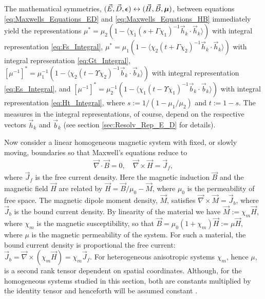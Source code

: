 \documentclass[english,12pt]{ttuthes}
\newcommand\beps{\mbox{\boldmath${\epsilon}$}}
\newcommand\bmu{\mbox{\boldmath${\mu}$}}
\begin{document}
The mathematical symmetries,
$(\vec{E},\vec{D},\beps)\leftrightarrow(\vec{H},\vec{B},\bmu)$, 
between equations \eqref{eq:Maxwells_Equations_ED} and
\eqref{eq:Maxwells_Equations_HB} immediately yield the representations
$\mu^*=\mu_2(1-\langle\chi_1(s+\Gamma\chi_1)^{-1}\vec{h}_k\cdot\vec{h}_k\rangle)$ with integral
representation \eqref{eq:Fs_Integral},
$\mu^*=\mu_1(1-\langle\chi_2(t+\Gamma\chi_2)^{-1}\vec{h}_k\cdot\vec{h}_k\rangle)$ with integral 
representation \eqref{eq:Gt_Integral},
$[\mu^{-1}]^*=\mu_1^{-1}(1-\langle\chi_2(t-\Upsilon\chi_2)^{-1}\vec{b}_k\cdot\vec{b}_k\rangle)$ with integral  
representation \eqref{eq:Es_Integral}, and
$[\mu^{-1}]^*=\mu_2^{-1}(1-\langle\chi_1(t-\Upsilon\chi_1)^{-1}\vec{b}_k\cdot\vec{b}_k\rangle)$ with
integral representation \eqref{eq:Ht_Integral}, where
$s:=1/(1-\mu_1/\mu_2)$ and $t:=1-s$. The measures in the integral
representations, of course, depend on the respective vectors
$\vec{h}_k$ and $\vec{b}_k$ (see section \ref{sec:Resolv_Rep_E_D} for
details). 

Now consider a linear homogeneous magnetic system with fixed, or slowly
moving, boundaries so that Maxwell's equations reduce to
\cite{Griffiths-1999}
%
\begin{align}
  \vec{\nabla}\cdot\vec{B}=0, \quad  \vec{\nabla}\times\vec{H}=\vec{J}_f,
\end{align}
%
where $\vec{J}_f$ is the free current density. Here the magnetic
induction $\vec{B}$ and the magnetic field $\vec{H}$ are related by
$\vec{H}=\vec{B}/\mu_0-\vec{M}$, where $\mu_0$ is the permeability of free
space. The magnetic dipole moment density, $\vec{M}$, satisfies
$\vec{\nabla}\times\vec{M}=\vec{J}_b$, where $\vec{J}_b$ is the bound current
density. By linearity of the material we have $\vec{M}:=\chi_m\vec{H}$,
where $\chi_m$ is the magnetic susceptibility, so that
$\vec{B}=\mu_0(1+\chi_m)\vec{H}:=\mu\vec{H}$, where $\mu$ is the
magnetic permeability of the system. For such a material,
the bound current density is proportional the free current:
$\vec{J}_b=\vec{\nabla}\times(\chi_m\vec{H})=\chi_m\vec{J}_f $. For heterogeneous
anisotropic systems $\chi_m$, hence $\mu$, is a second rank tensor 
dependent on spatial coordinates. Although, for the homogeneous systems
studied in this section, both are constants multiplied by the identity
tensor and henceforth will be assumed constant
\cite{Jackson-1999,Griffiths-1999,Reitz-1993,Robertson-1993,Bobbio-2000}.  
\end{document}
